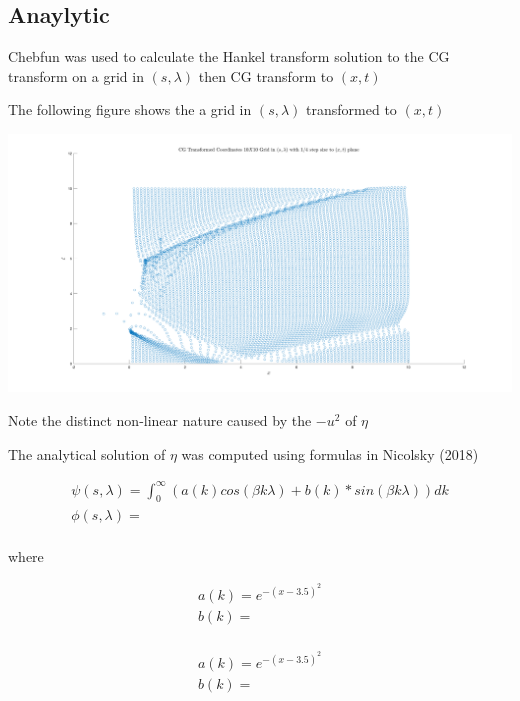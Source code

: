 \documentclass{article}
\begin{document}
\subsection{Anaylytic}

Chebfun was used to calculate the Hankel transform solution to the CG transform on a grid in $(s,\lambda)$ then CG transform to $(x,t)$

\noindent The following figure shows the a grid in $(s,\lambda)$ transformed to $(x,t)$

\includegraphics[width=\linewidth]{images/scatter.png} 

\noindent Note the distinct non-linear nature caused by the $-u^2$ of $\eta$

\noindent The analytical solution of $\eta$ was computed using formulas in Nicolsky (2018)

\[
\begin{aligned}
\psi (s, \lambda ) = \int_{0}^\infty (a(k)cos(\beta k \lambda)+b(k)*sin(\beta k \lambda) )dk \\
\phi (s, \lambda ) =  \\
\end{aligned}
\]

where

\[
\begin{aligned}
a(k) = e^{-(x-3.5)^2} \\
b(k) =  \\
\end{aligned}
\]

\[
\begin{aligned}
a(k) = e^{-(x-3.5)^2} \\
b(k) =  \\
\end{aligned}
\]
\end{document}
